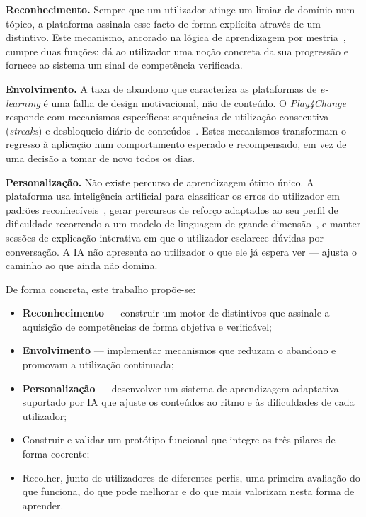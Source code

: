 \textbf{Reconhecimento.} Sempre que um utilizador atinge um limiar de domínio num tópico, a plataforma assinala esse facto de forma explícita através de um distintivo. Este mecanismo, ancorado na lógica de aprendizagem por mestria~\cite{bloom1968learning}, cumpre duas funções: dá ao utilizador uma noção concreta da sua progressão e fornece ao sistema um sinal de competência verificada.

\textbf{Envolvimento.} A taxa de abandono que caracteriza as plataformas de \emph{e-learning} é uma falha de design motivacional, não de conteúdo. O \emph{Play4Change} responde com mecanismos específicos: sequências de utilização consecutiva (\emph{streaks}) e desbloqueio diário de conteúdos~\cite{ott2019gamification}. Estes mecanismos transformam o regresso à aplicação num comportamento esperado e recompensado, em vez de uma decisão a tomar de novo todos os dias.

\textbf{Personalização.} Não existe percurso de aprendizagem ótimo único. A plataforma usa inteligência artificial para classificar os erros do utilizador em padrões reconhecíveis~\cite{vanlehn2011relative}, gerar percursos de reforço adaptados ao seu perfil de dificuldade recorrendo a um modelo de linguagem de grande dimensão~\cite{kasneci2023chatgpt}, e manter sessões de explicação interativa em que o utilizador esclarece dúvidas por conversação. A IA não apresenta ao utilizador o que ele já espera ver --- ajusta o caminho ao que ainda não domina.

De forma concreta, este trabalho propõe-se:

\begin{itemize}
	\item \textbf{Reconhecimento} --- construir um motor de distintivos que assinale a aquisição de competências de forma objetiva e verificável;
	\item \textbf{Envolvimento} --- implementar mecanismos que reduzam o abandono e promovam a utilização continuada;
	\item \textbf{Personalização} --- desenvolver um sistema de aprendizagem adaptativa suportado por IA que ajuste os conteúdos ao ritmo e às dificuldades de cada utilizador;
	\item Construir e validar um protótipo funcional que integre os três pilares de forma coerente;
	\item Recolher, junto de utilizadores de diferentes perfis, uma primeira avaliação do que funciona, do que pode melhorar e do que mais valorizam nesta forma de aprender.
\end{itemize}

